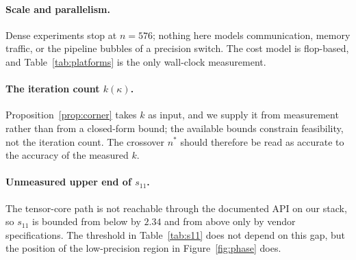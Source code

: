 \paragraph{Scale and parallelism.}
Dense experiments stop at $n=576$; nothing here models communication, memory
traffic, or the pipeline bubbles of a precision switch. The cost model is
flop-based, and Table~\ref{tab:platforms} is the only wall-clock measurement.

\paragraph{The iteration count $k(\kappa)$.}
Proposition~\ref{prop:corner} takes $k$ as input, and we supply it from
measurement rather than from a closed-form bound; the available bounds
\cite{hm2022} constrain feasibility, not the iteration count. The crossover
$n^*$ should therefore be read as accurate to the accuracy of the measured $k$.

\paragraph{Unmeasured upper end of $s_{11}$.}
The tensor-core path is not reachable through the documented API on our stack,
so $s_{11}$ is bounded from below by $2.34$ and from above only by vendor
specifications. The threshold in Table~\ref{tab:s11} does not depend on this
gap, but the position of the low-precision region in Figure~\ref{fig:phase} does.
